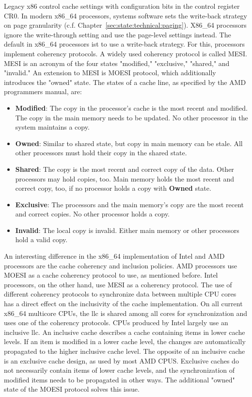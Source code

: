 Legacy x86 control cache settings with configuration bits in the control
register CR0. In modern x86\_64 processors, systems software sets the write-back
strategy on page granularity (c.f. Chapter~\ref{sec:state:technical:paging}).
X86\_64 processors ignore the write-through setting and use the page-level
settings instead. \cite{amd_manual} The default in x86\_64 processors ist to use
a write-back strategy. For this, processors implement coherency protocols. A
widely used coherency protocol is called MESI. MESI is an acronym of the four
states "modified," "exclusive," "shared," and "invalid." An extension to MESI is
MOESI protocol, which additionally introduces the "owned" state. The states of a
cache line, as specified by the AMD programmers manual, are:
\begin{itemize}
    \item \textbf{Modified}: The copy in the processor's cache is the most
          recent and modified. The copy in the main memory needs to be updated.
          No other processor in the system maintains a copy.
    \item \textbf{Owned}: Similar to shared state, but copy in main memory can
          be stale. All other processors must hold their copy in the shared
          state.
    \item \textbf{Shared}:  The copy is the most recent and correct copy of the
          data. Other processors may hold copies, too. Main memory holds the
          most recent and correct copy, too, if no processor holds a copy with
          \textbf{Owned} state.
    \item \textbf{Exclusive}: The processors and the main memory's copy are the
          most recent and correct copies. No other processor holds a copy.
    \item \textbf{Invalid}: The local copy is invalid. Either main memory or
          other processors hold a valid copy.
\end{itemize}

An interesting difference in the x86\_64 implementation of Intel and AMD
processors are the cache coherency and inclusion policies. AMD processors use
MOESI as a cache coherency protocol to use, as mentioned
before.\cite{amd_manual} Intel processors, on the other hand, use MESI as a
coherency protocol. \cite{intel_sdm} The use of different coherency protocols to
synchronize data between multiple CPU cores has a direct effect on the
inclusivity of the cache implementation. On all current x86\_64 multicore CPUs,
the \gls{llc} is shared among all cores for synchronization and uses one
of the coherency protocols. CPUs produced by Intel largely use an inclusive
\gls{llc}. An inclusive cache describes a cache containing items in lower
cache levels. If an item is modified in a lower cache level, the changes are
automatically propagated to the higher inclusive cache level. The opposite of an
inclusive cache is an exclusive cache design, as used by most AMD CPUS.
Exclusive caches do not necessarily contain items of lower cache levels, and the
synchronization of modified items needs to be propagated in other ways. The
additional "owned" state of the MOESI protocol solves this issue.

